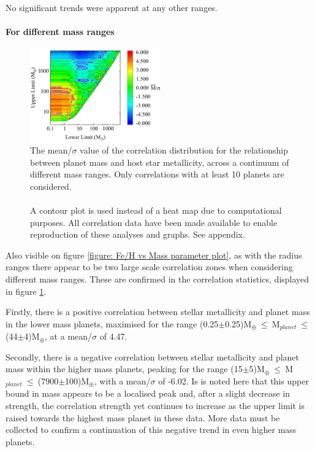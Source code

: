 \documentclass[a4paper,twocolumn,12pt]{article}
\begin{document}
No significant trends were apparent at any other ranges.



\paragraph{For different mass ranges}
\vspace{-0.7em}

\begin{figure}[h!]
    \centering
    \includegraphics[width=0.5\textwidth]{Graphs/FeH vs Mass correlations - Mass ranges.pdf}
    \caption{The mean/$\sigma$ value of the correlation distribution for the relationship between planet mass and host star metallicity, across a continuum of different mass ranges. Only correlations with at least 10 planets are considered.\\\\A contour plot is used instead of a heat map due to computational purposes. All correlation data have been made available to enable reproduction of these analyses and graphs. See appendix.} %
    \label{figure: Fe/H vs Mass correlations - Mass ranges}
\end{figure}


Also visible on figure \ref{figure: Fe/H vs Mass parameter plot}, as with the radius ranges there appear to be two large scale correlation zones when considering different mass ranges. These are confirmed in the correlation statistics, displayed in figure \ref{figure: Fe/H vs Mass correlations - Mass ranges}.

Firstly, there is a positive correlation between stellar metallicity and planet mass in the lower mass planets, maximised for the range (0.25$\pm$0.25)M$_{\oplus}~\leq~$M$_{planet}~\leq~$(44$\pm$4)M$_{\oplus}$, at a mean/$\sigma$ of 4.47.

Secondly, there is a negative correlation between stellar metallicity and planet mass within the higher mass planets, peaking for the range (15$\pm$5)M$_{\oplus}~\leq~$M$_{planet}~\leq~$(7900$\pm$100)M$_{\oplus}$, with a mean/$\sigma$ of -6.02. Is is noted here that this upper bound in mass appears to be a localised peak and, after a slight decrease in strength, the correlation strength yet continues to increase as the upper limit is raised towards the highest mass planet in these data. More data must be collected to confirm a continuation of this negative trend in even higher mass planets.
\end{document}
